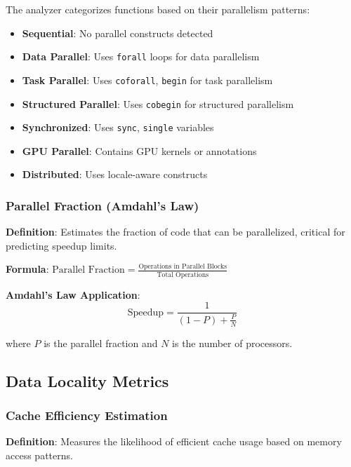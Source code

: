 \documentclass[11pt,a4paper]{article}
\begin{document}
The analyzer categorizes functions based on their parallelism patterns:

\begin{itemize}
    \item \textbf{Sequential}: No parallel constructs detected
    \item \textbf{Data Parallel}: Uses \texttt{forall} loops for data parallelism
    \item \textbf{Task Parallel}: Uses \texttt{coforall}, \texttt{begin} for task parallelism
    \item \textbf{Structured Parallel}: Uses \texttt{cobegin} for structured parallelism
    \item \textbf{Synchronized}: Uses \texttt{sync}, \texttt{single} variables
    \item \textbf{GPU Parallel}: Contains GPU kernels or annotations
    \item \textbf{Distributed}: Uses locale-aware constructs
\end{itemize}

\subsubsection{Parallel Fraction (Amdahl's Law)}

\textbf{Definition}: Estimates the fraction of code that can be parallelized, critical for predicting speedup limits.

\textbf{Formula}: $\text{Parallel Fraction} = \frac{\text{Operations in Parallel Blocks}}{\text{Total Operations}}$

\textbf{Amdahl's Law Application}:
\begin{equation}
\text{Speedup} = \frac{1}{(1-P) + \frac{P}{N}}
\end{equation}

where $P$ is the parallel fraction and $N$ is the number of processors.

\subsection{Data Locality Metrics}

\subsubsection{Cache Efficiency Estimation}

\textbf{Definition}: Measures the likelihood of efficient cache usage based on memory access patterns.
\end{document}
